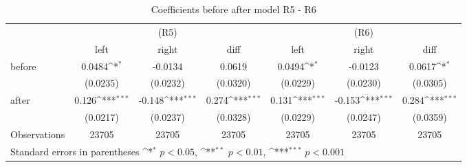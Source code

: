 \begin{table}[!ht]\centering \footnotesize
\def\sym#1{\ifmmode^{#1}\else\(^{#1}\)\fi}
\caption{Coefficients before after model R5 - R6}
\begin{tabular}{l*{6}{c}}
\hline\hline
                    &\multicolumn{3}{c}{(R5)}&\multicolumn{3}{c}{(R6)}\\
&\multicolumn{1}{c}{left}&\multicolumn{1}{c}{right}&\multicolumn{1}{c}{diff}&\multicolumn{1}{c}{left}&\multicolumn{1}{c}{right}&\multicolumn{1}{c}{diff}\\
\hline
before              &      0.0484\sym{*}  &     -0.0134         &      0.0619         &      0.0494\sym{*}  &     -0.0123         &      0.0617\sym{*}  \\
                    &    (0.0235)         &    (0.0232)         &    (0.0320)         &    (0.0229)         &    (0.0230)         &    (0.0305)         \\
[0.5em]
after               &       0.126\sym{***}&      -0.148\sym{***}&       0.274\sym{***}&       0.131\sym{***}&      -0.153\sym{***}&       0.284\sym{***}\\
                    &    (0.0217)         &    (0.0237)         &    (0.0328)         &    (0.0229)         &    (0.0247)         &    (0.0359)         \\
\hline
Observations        &       23705         &       23705         &       23705         &       23705         &       23705         &       23705         \\
\hline\hline
\multicolumn{7}{l}{ Standard errors in parentheses \sym{*} \(p<0.05\), \sym{**} \(p<0.01\), \sym{***} \(p<0.001\)}\\
\end{tabular}
\end{table}
